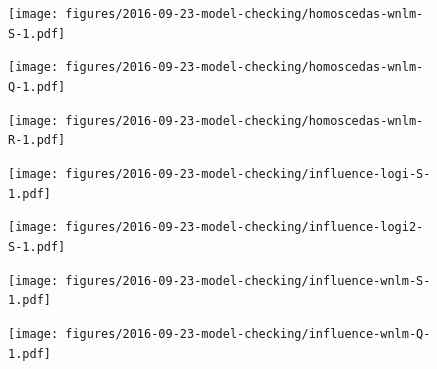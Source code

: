 \documentclass[letterpaper]{article}
\begin{document}
\begin{figure}
\begin{center}
\texttt{[image: figures/2016-09-23-model-checking/homoscedas-wnlm-S-1.pdf]}
\end{center}
\caption{}
\label{fig:homoscedas-wnlm.S}
\end{figure}

\begin{figure}
\begin{center}
\texttt{[image: figures/2016-09-23-model-checking/homoscedas-wnlm-Q-1.pdf]}
\end{center}
\caption{}
\label{fig:homoscedas-wnlm.Q}
\end{figure}

\begin{figure}
\begin{center}
\texttt{[image: figures/2016-09-23-model-checking/homoscedas-wnlm-R-1.pdf]}
\end{center}
\caption{}
\label{fig:homoscedas-wnlm.R}
\end{figure}

\begin{figure}
\begin{center}
\texttt{[image: figures/2016-09-23-model-checking/influence-logi-S-1.pdf]}
\end{center}
\caption{}
\label{fig:influence-logi.S}
\end{figure}

\begin{figure}
\begin{center}
\texttt{[image: figures/2016-09-23-model-checking/influence-logi2-S-1.pdf]}
\end{center}
\caption{}
\label{fig:influence-logi2.S}
\end{figure}

\begin{figure}
\begin{center}
\texttt{[image: figures/2016-09-23-model-checking/influence-wnlm-S-1.pdf]}
\end{center}
\caption{}
\label{fig:influence-wnlm.S}
\end{figure}

\begin{figure}
\begin{center}
\texttt{[image: figures/2016-09-23-model-checking/influence-wnlm-Q-1.pdf]}
\end{center}
\caption{}
\label{fig:influence-wnlm.Q}
\end{figure}
\end{document}
